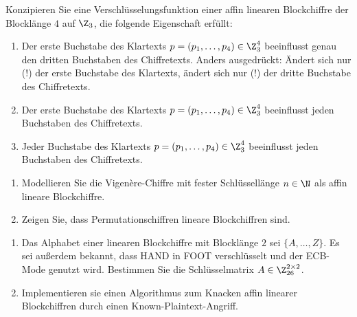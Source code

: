 \documentclass[german]{mhexsheet}
\begin{document}
\maketitle

\begin{exercise}[title = Diffusion affin linearer Blockchiffren]
 Konzipieren Sie eine Verschlüsselungsfunktion einer affin linearen Blockchiffre der Blocklänge $4$ auf $\Z_3$, die folgende Eigenschaft erfüllt:
 \begin{enumerate}
  \item Der erste Buchstabe des Klartexts $p = (p_1, \dots, p_4) \in \Z_3^4$ beeinflusst genau den dritten Buchstaben des Chiffretexts. Anders ausgedrückt: Ändert sich nur (!) der erste Buchstabe des Klartexts, ändert sich nur (!) der dritte Buchstabe des Chiffretexts.
  \item Der erste Buchstabe des Klartexts $p = (p_1, \dots, p_4) \in \Z_3^4$ beeinflusst jeden Buchstaben des Chiffretexts.
  \item Jeder Buchstabe des Klartexts $p = (p_1, \dots, p_4) \in \Z_3^4$ beeinflusst jeden Buchstaben des Chiffretexts.
 \end{enumerate}
\end{exercise}


\begin{exercise}[title = Beispiele affin linearer Blockchiffren]
\begin{enumerate}
 \item Modellieren Sie die Vigenère-Chiffre mit fester Schlüssellänge $n \in \N$ als affin lineare Blockchiffre. 
 \item Zeigen Sie, dass Permutationschiffren lineare Blockchiffren sind.
 \end{enumerate}
\end{exercise}

\begin{exercise}[title = Knacken affin linearer Blockchiffren]
 \begin{enumerate}
  \item Das Alphabet einer linearen Blockchiffre mit Blocklänge $2$ sei $\{A, \dotsc, Z\}$. Es sei außerdem bekannt, dass HAND in FOOT verschlüsselt und der ECB-Mode genutzt wird. Bestimmen Sie die Schlüsselmatrix $A \in \Z_{26}^{2 \times 2}$.
  \item Implementieren sie einen Algorithmus zum Knacken affin linearer Blockchiffren durch einen Known-Plaintext-Angriff.
 \end{enumerate}
\end{exercise}
\end{document}
